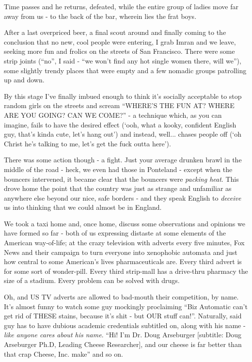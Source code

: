 \documentclass[a5paper,titlepage,11pt]{book}
\begin{document}
Time passes and he returns, defeated, while the entire group of ladies move far away from us - to the back of the bar, wherein lies the frat boys.

After a last overpriced beer, a final scout around and finally coming to the conclusion that no new, cool people were entering, I grab Imran and we leave, seeking more fun and frolics on the streets of San Francisco.  There were some strip joints (``no'', I said - ``we won't find any hot single women there, will we''), some slightly trendy places that were empty and a few nomadic groups patrolling up and down.

By this stage I've finally imbued enough to think it's socially acceptable to stop random girls on the streets and scream ``WHERE'S THE FUN AT?  WHERE ARE YOU GOING?  CAN WE COME?'' - a technique which, as you can imagine, fails to have the desired effect (`ooh, what a kooky, confident English guy, that's kinda cute, let's hang out') and instead, well... chases people off (`oh Christ he's talking to me, let's get the fuck outta here').

There was some action though - a fight.  Just your average drunken brawl in the middle of the road - heck, we even had those in Ponteland - except when the bouncers intervened, it became clear that the bouncers were \emph{packing heat}.  This drove home the point that the country was just as strange and unfamiliar as anywhere else beyond our nice, safe borders - and they speak English to \emph{deceive} us into thinking that we could almost be in England.

We took a taxi home and, once home, discuss some observations and opinions we have formed so far - both of us expressing distaste at some elements of the American way-of-life; at the crazy television with adverts every five minutes, Fox News and their campaign to turn everyone into xenophobic automata and just how central to some American's lives pharmaceuticals are.  Every third advert is for some sort of wonder-pill.  Every third strip-mall has a drive-thru pharmacy the size of a stadium.  Every problem can be solved with drugs.

Oh, and US TV adverts are allowed to bad-mouth their competition, by name.  It's almost funny to watch some guy mockingly proclaiming ``Biz Automatic can't get rid of THESE stains, because it's shit - but OUR stuff can!''.  Naturally, said guy has to have dubious academic credentials subtitled on, along with his name - \emph{like anyone cares about his name}. ``Hi! I'm Dr. Doug Arseburger [subtitle: Doug Arseburger Ph.D, Leading Cheese Researcher], and our cheese is far better than that crap Cheese, Inc. make'' and so on.
\end{document}
